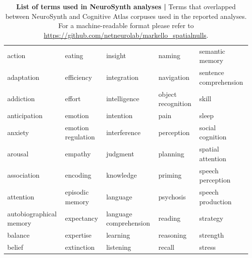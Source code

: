 \documentclass[12pt,aps,pra,reprint,showkeys]{revtex4-1}
\begin{document}
\begin{table}[htp]
  \begin{minipage}[c][\textheight][c]{\textwidth}
    \caption{
      \textbf{List of terms used in NeuroSynth analyses | }
      Terms that overlapped between NeuroSynth \citep{yarkoni2011natmethods} and Cognitive Atlas \citep{poldrack2011frontiers} corpuses used in the reported analyses.
      For a machine-readable format please refer to \url{https://github.com/netneurolab/markello_spatialnulls}.
    }
    \label{-ns-terms}
    \setlength{\tabcolsep}{4.5pt}
    \renewcommand{\arraystretch}{1.1}
    \begin{center}
      \begin{tabular}{l l l l l}
        action                  & eating             & insight                & naming                 & semantic memory        \\
        adaptation              & efficiency         & integration            & navigation             & sentence comprehension \\
        addiction               & effort             & intelligence           & object recognition     & skill                  \\
        anticipation            & emotion            & intention              & pain                   & sleep                  \\
        anxiety                 & emotion regulation & interference           & perception             & social cognition       \\
        arousal                 & empathy            & judgment               & planning               & spatial attention      \\
        association             & encoding           & knowledge              & priming                & speech perception      \\
        attention               & episodic memory    & language               & psychosis              & speech production      \\
        autobiographical memory & expectancy         & language comprehension & reading                & strategy               \\
        balance                 & expertise          & learning               & reasoning              & strength               \\
        belief                  & extinction         & listening              & recall                 & stress                 \\

\end{tabular}
\end{center}
\end{minipage}
\end{table}
\end{document}
